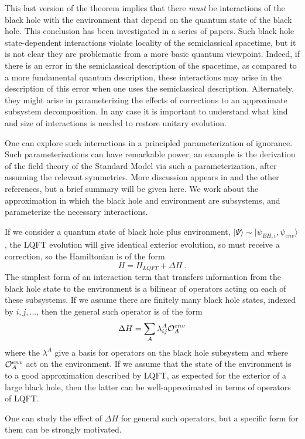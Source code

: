 \documentclass[12pt]{article}
\numberwithin{equation}{section}
\newcommand{\calo}{{\cal O}}
\newcommand{\beq}{\begin{equation}}
\newcommand{\eeq}{\end{equation}}
\begin{document}
This last version of the theorem implies that there {\it must} be interactions of the black hole with the environment that depend on the quantum state of the black hole.  This conclusion has been investigated in a series of papers\cite{SGmodels,BHQIUE,GiSh1,NVNL,NVUEFT,GiSh2,NVNLT,SGObs,NVU}.  Such black hole state-dependent interactions violate locality of the semiclassical spacetime, but it is not clear they are problematic from a more basic quantum viewpoint.  Indeed, if there is an error in the semiclassical description of the spacetime, as compared to a more fundamental quantum description, these interactions may arise in the description of this error when one uses the semiclassical description.  Alternately, they might arise in parameterizing the effects of corrections to an approximate subsystem decomposition.  In any case it is important to understand what kind and size of interactions is needed to restore unitary evolution.

One can explore such interactions in a principled parameterization of ignorance.  Such parameterizations can have remarkable power; an example is the derivation of the field theory of the Standard Model via such a parameterization, after assuming the relevant symmetries.  More discussion appears in \cite{BHQU} and the other references, but a brief summary will be given here.  We work about the approximation in which the black hole and environment are subsystems, and parameterize the necessary interactions.

If we consider a quantum state of black hole plus environment, $|\Psi\rangle \sim |\psi_{BH,i},\psi_{env}\rangle$, the LQFT evolution will give identical exterior evolution, so must receive a correction, so the Hamiltonian is of the form
\beq
H=H_{LQFT} + \Delta H\ .
\eeq
 The simplest form of an interaction term that transfers information from the black hole state to the environment is a bilinear of operators acting on each of these subsystems.   If we assume there are finitely many black hole states, indexed by $i,j,...$, then the general such operator is of the form
 \beq
 \Delta H = \sum_A \lambda^A_{ij} {\cal O}^{env}_A
 \eeq
 where the $\lambda^A$ give a basis for operators on the black hole subsystem and where $\calo_A^{env}$ act on the environment.  If we assume that the state of the environment is to a good approximation described by LQFT, as expected for the exterior of a large black hole, then the latter can be well-approximated in terms of operators of LQFT.

One can study the effect of $\Delta H$ for general such operators\cite{NVUEFT,GiSh2}, but a specific form for them can be strongly motivated.  
\end{document}
